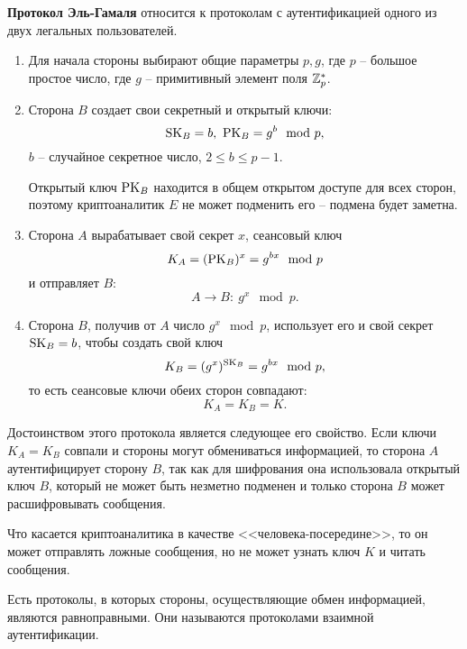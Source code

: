 \textbf{Протокол Эль-Гамаля} относится к протоколам с аутентификацией одного из двух легальных пользователей.
\begin{enumerate}
    \item Для начала стороны выбирают общие параметры $p, g$, где $p$ -- большое простое число, где $g$ -- примитивный элемент поля $\mathbb{Z}_p^*$.
    \item Сторона $B$ создает свои секретный и открытый ключи:
            \[ \textrm{SK}_B = b, ~ \textrm{PK}_B = g^b \mod p, \]
        $b$ -- случайное секретное число, $2 \leq b \leq p-1$.

        Открытый ключ $\textrm{PK}_B$ находится в общем открытом доступе для всех сторон, поэтому криптоаналитик $E$ не может подменить его -- подмена будет заметна.
    \item Сторона $A$ вырабатывает свой секрет $x$, сеансовый ключ
            \[ K_A = (\textrm{PK}_B)^x = g^{bx} \mod p \]
        и отправляет $B$:
            \[ A \rightarrow B: ~ g^x \mod p. \]
    \item Сторона $B$, получив от $A$ число $g^x \mod p$, использует его и свой секрет $\textrm{SK}_B = b$, чтобы создать свой ключ
            \[ K_B = (g^x)^{\textrm{SK}_B} = g^{bx} \mod p, \]
        то есть сеансовые ключи обеих сторон совпадают:
            \[ K_A = K_B = K. \]
\end{enumerate}

Достоинством этого протокола является следующее его свойство. Если ключи $K_A = K_B$ совпали и стороны могут обмениваться информацией, то сторона $A$ аутентифицирует сторону $B$, так как для шифрования она использовала открытый ключ $B$, который не может быть незметно подменен и только сторона $B$ может расшифровывать сообщения.

Что касается криптоаналитика в качестве <<человека-посередине>>, то он может отправлять ложные сообщения, но не может узнать ключ $K$ и читать сообщения.

Есть протоколы, в которых стороны, осуществляющие обмен информацией, являются равноправными. Они называются протоколами взаимной аутентификации.
